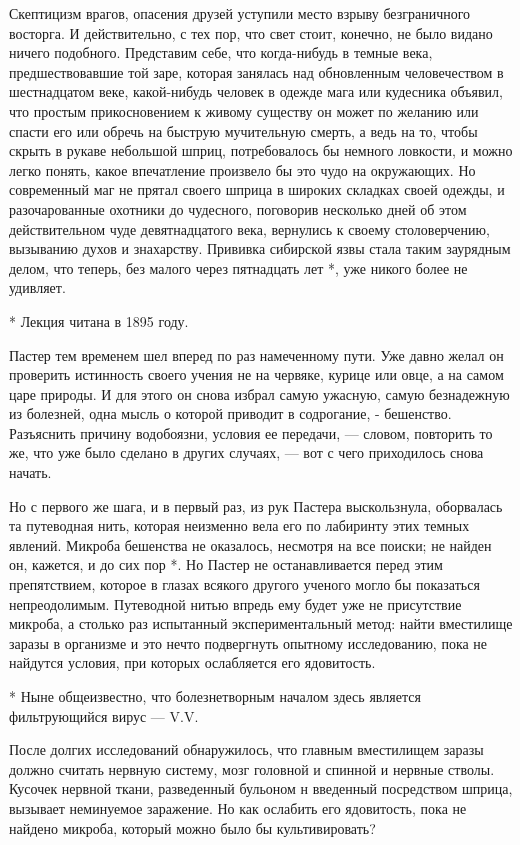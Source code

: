 Скептицизм врагов, опасения друзей  уступили место взрыву  безграничного
восторга. И действительно, с тех пор,  что свет стоит, конечно, не  было
видано ничего  подобного. Представим  себе,  что когда-нибудь  в  темные
века,  предшествовавшие  той  заре,  которая  занялась  над  обновленным
человечеством в шестнадцатом  веке, какой-нибудь человек  в одежде  мага
или кудесника объявил, что простым  прикосновением к живому существу  он
может по  желанию  или спасти  его  или обречь  на  быструю  мучительную
смерть,  а  ведь  на  то,   чтобы  скрыть  в  рукаве  небольшой   шприц,
потребовалось  бы  немного  ловкости,   и  можно  легко  понять,   какое
впечатление произвело бы это чудо  на окружающих. Но современный маг  не
прятал своего шприца в широких  складках своей одежды, и  разочарованные
охотники до чудесного, поговорив  несколько дней об этом  действительном
чуде девятнадцатого века,  вернулись к  своему столоверчению,  вызыванию
духов и знахарству. Прививка сибирской язвы стала таким заурядным делом,
что теперь,  без малого  через пятнадцать  лет *,  уже никого  более  не
удивляет.

* Лекция читана в 1895 году.

Пастер тем временем шел вперед по раз намеченному пути. Уже давно  желал
он проверить истинность своего учения не на червяке, курице или овце,  а
на самом царе природы. И для этого он снова избрал самую ужасную,  самую
безнадежную из болезней, одна мысль  о которой приводит в содрогание,  -
бешенство. Разъяснить причину водобоязни, условия ее передачи, --- словом,
повторить то же, что  уже было сделано  в других случаях,  --- вот с  чего
приходилось снова начать.

Но с  первого же  шага, и  в первый  раз, из  рук Пастера  выскользнула,
оборвалась та путеводная нить, которая  неизменно вела его по  лабиринту
этих темных явлений.  Микроба бешенства  не оказалось,  несмотря на  все
поиски;  не  найден  он,  кажется,  и  до  сих  пор  *.  Но  Пастер   не
останавливается  перед  этим  препятствием,  которое  в  глазах  всякого
другого ученого  могло  бы показаться  непреодолимым.  Путеводной  нитью
впредь ему будет уже  не присутствие микроба,  а столько раз  испытанный
экспериментальный метод: найти вместилище заразы в организме и это нечто
подвергнуть опытному исследованию, пока не найдутся условия, при которых
ослабляется его ядовитость.

* Ныне общеизвестно, что болезнетворным началом здесь является
фильтрующийся вирус --- V.V.

После долгих исследований обнаружилось,  что главным вместилищем  заразы
должно считать  нервную  систему,  мозг головной  и  спинной  и  нервные
стволы.  Кусочек  нервной  ткани,   разведенный  бульоном  н   введенный
посредством шприца, вызывает неминуемое  заражение. Но как ослабить  его
ядовитость,  пока   не   найдено   микроба,  который   можно   было   бы
культивировать?

